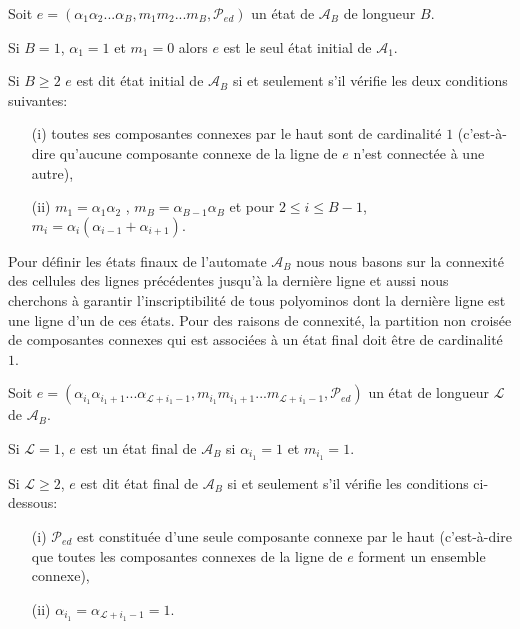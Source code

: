 \begin{Def}\label{defAt8}
Soit $e=(\alpha_{1}\alpha_{2}...\alpha_{B},m_{1}m_{2}...m_{B},\mathcal{P}_{ed})$ un état  de $\mathcal{A}_{B}$ de longueur $B$. 

Si $B=1$, $\alpha_{1}=1$ et $m_{1}=0$ alors $e$ est le seul état initial de $\mathcal{A}_{1}$. 

Si $B\geq 2$  $e$ est dit état initial de $\mathcal{A}_{B}$ si et seulement s'il vérifie les deux conditions suivantes:
\begin{itemize}
 \item[(i)] toutes ses composantes connexes par le haut  sont de cardinalité $1$ (c'est-à-dire qu'aucune composante connexe de la ligne de $e$ n'est connectée à une autre),  \item[(ii)]$m_{1}=\alpha_{1}\alpha_{2}$ , $m_{B}=\alpha_{B-1}\alpha_{B}$ et pour $2\leq i\leq B-1$, $m_{i}=\alpha_{i}(\alpha_{i-1}+\alpha_{i+1}).$
\end{itemize}
\end{Def}
Pour définir les états finaux de l'automate $\mathcal{A}_{B}$ nous nous basons sur la connexité des cellules des lignes précédentes jusqu'à la dernière ligne et aussi nous cherchons à garantir l'inscriptibilité de tous polyominos dont la dernière ligne est une ligne d'un de ces états. Pour des raisons de connexité, la partition non croisée de composantes connexes qui  est associées à un état final doit être de cardinalité $1$. 
\begin{Def}\label{defAt9}
Soit $e=(\alpha_{i_{1}}\alpha_{i_{1}+1}...\alpha_{\mathcal{L}+i_{1}-1},m_{i_{1}}m_{i_{1}+1}...m_{\mathcal{L}+i_{1}-1},\mathcal{P}_{ed})$  un état de longueur $\mathcal{L}$ de $\mathcal{A}_{B}$. 

 Si $\mathcal{L}=1$, $e$ est un état final de $\mathcal{A}_{B}$ si $\alpha_{i_{1}}=1$ et $m_{i_{1}}=1$.
 
Si $\mathcal{L}\geq 2$, $e$ est dit état final de $\mathcal{A}_{B}$ si et seulement s'il vérifie les conditions ci-dessous:
\begin{itemize}
 \item[(i)]$\mathcal{P}_{ed}$ est  constituée d'une seule composante connexe par le haut (c'est-à-dire que toutes les composantes connexes de la ligne de $e$ forment un ensemble connexe), 
 \item[(ii)]$\alpha_{i_{1}}=\alpha_{\mathcal{L}+i_{1}-1}=1$.
\end{itemize}
\end{Def}
